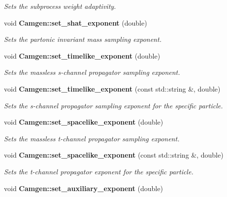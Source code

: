\begin{DoxyCompactItemize}
\begin{DoxyCompactList}\small\item\em Sets the subprocess weight adaptivity. \end{DoxyCompactList}\item 
\hypertarget{a00878_acd478e4f8ff312797facbc7a9c74d69f}{}void {\bfseries Camgen\+::set\+\_\+shat\+\_\+exponent} (double)\label{a00878_acd478e4f8ff312797facbc7a9c74d69f}

\begin{DoxyCompactList}\small\item\em Sets the partonic invariant mass sampling exponent. \end{DoxyCompactList}\item 
\hypertarget{a00878_ac4bac649996298dbef5922d5ca7dc18d}{}void {\bfseries Camgen\+::set\+\_\+timelike\+\_\+exponent} (double)\label{a00878_ac4bac649996298dbef5922d5ca7dc18d}

\begin{DoxyCompactList}\small\item\em Sets the massless s-\/channel propagator sampling exponent. \end{DoxyCompactList}\item 
void {\bfseries Camgen\+::set\+\_\+timelike\+\_\+exponent} (const std\+::string \&, double)
\begin{DoxyCompactList}\small\item\em Sets the s-\/channel propagator sampling exponent for the specific particle. \end{DoxyCompactList}\item 
\hypertarget{a00878_a3b4a0019472e13464986668d917321e9}{}void {\bfseries Camgen\+::set\+\_\+spacelike\+\_\+exponent} (double)\label{a00878_a3b4a0019472e13464986668d917321e9}

\begin{DoxyCompactList}\small\item\em Sets the massless t-\/channel propagator sampling exponent. \end{DoxyCompactList}\item 
\hypertarget{a00878_a5c96576e6580d80d8661445d7700043f}{}void {\bfseries Camgen\+::set\+\_\+spacelike\+\_\+exponent} (const std\+::string \&, double)\label{a00878_a5c96576e6580d80d8661445d7700043f}

\begin{DoxyCompactList}\small\item\em Sets the t-\/channel propagator exponent for the specific particle. \end{DoxyCompactList}\item 
\hypertarget{a00878_a219249a7b2b4cf736431df5ffb416d3a}{}void {\bfseries Camgen\+::set\+\_\+auxiliary\+\_\+exponent} (double)\label{a00878_a219249a7b2b4cf736431df5ffb416d3a}


\end{DoxyCompactItemize}

